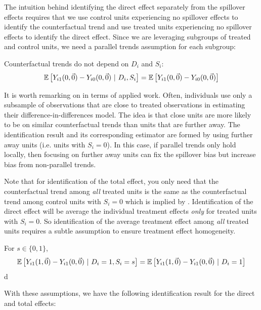 \documentclass[11pt]{article}
\begin{document}
The intuition behind identifying the direct effect separately from the spillover effects requires that we use control units experiencing no spillover effects to identify the counterfactual trend and use treated units experiencing no spillover effects to identify the direct effect. Since we are leveraging subgroups of treated and control units, we need a parallel trends assumption for each subgroup:

\begin{assumption}\label{assumption:parallel-mod}
    Counterfactual trends do not depend on $D_i$ and $S_i$:
    \[
        \mathbb{E}\left[Y_{i1}(0, \vec{0}) - Y_{i0}(0, \vec{0}) \ \vert \ D_i, S_i\right] = 
        \mathbb{E}\left[Y_{i1}(0, \vec{0}) - Y_{i0}(0, \vec{0})\right]
    \]
\end{assumption}

It is worth remarking on  in terms of applied work. Often, individuals use only a subsample of observations that are close to treated observations in estimating their difference-in-differences model. The idea is that close units are more likely to be on similar counterfactual trends than units that are further away. The identification result and its corresponding estimator are formed by using further away units (i.e. units with $S_i = 0$). In this case, if parallel trends only hold locally, then focusing on further away units can fix the spillover bias but increase bias from non-parallel trends.

Note that for identification of the total effect, you only need that the counterfactual trend among \emph{all} treated units is the same as the counterfactual trend among control units with $S_i = 0$ which is implied by . Identification of the direct effect will be average the individual treatment effects \emph{only} for treated units with $S_i = 0$. So identification of the average treatment effect among \emph{all} treated units requires a subtle assumption to ensure treatment effect homogeneity.

\begin{assumption}\label{assumption:homogenous-direct}
    For $s \in \{0, 1\}$,
    \[
        \mathbb{E}\left[Y_{i1}(1, \vec{0}) - Y_{i1}(0, \vec{0}) \ \vert \ D_i = 1, S_i = s\right] = 
        \mathbb{E}\left[Y_{i1}(1, \vec{0}) - Y_{i1}(0, \vec{0}) \ \vert \ D_i = 1\right]
    \]d
\end{assumption}

With these assumptions, we have the following identification result for the direct and total effects:
\end{document}
